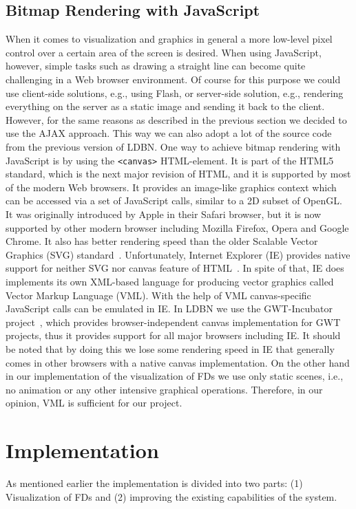 \subsection{Bitmap Rendering with JavaScript}
\label{sec:renderingJS}
When it comes to visualization and graphics in general a more low-level 
pixel control over a certain area of the screen is desired. 
When using JavaScript, however, simple tasks such as drawing a straight
line can become quite challenging in a Web browser environment.
Of course for this purpose we could use client-side solutions, e.g., 
using Flash, or server-side solution, e.g., 
rendering everything on the server as a static image 
and sending it back
to the client. However, for the same reasons as described in the previous
section we decided to use the AJAX approach. This way we can also
adopt a lot of the source code from the previous version of LDBN. 
One way to achieve bitmap rendering with JavaScript is by
using the \verb=<canvas>= HTML-element. 
It is part of the HTML5~\cite{html5} standard, which is the next major revision of HTML, and it is supported by
most of the modern Web browsers. It provides an image-like 
graphics context which can be accessed via a set of JavaScript calls, 
similar to a 2D subset of OpenGL. 
It was originally introduced by Apple in their Safari browser, but it is now 
supported by other modern browser including Mozilla Firefox, Opera and Google Chrome.
It also has better rendering speed than the older Scalable Vector Graphics (SVG) standard~\cite{w8}. 
Unfortunately, Internet Explorer (IE) provides native support for 
neither SVG nor canvas feature of HTML~\cite{w9}. In spite of that, IE does 
implements its own XML-based language for producing vector graphics 
called Vector Markup Language (VML). With the help of VML canvas-specific JavaScript 
calls can be emulated in IE. In LDBN we use the GWT-Incubator project~\cite{gwtincubator}, which provides
browser-independent canvas implementation for GWT projects, thus 
it provides support for all major browsers including IE. 
It should be noted that by doing this
we lose some rendering speed in IE that generally comes in other browsers
with a native canvas implementation. 
On the other hand in our implementation of the visualization of FDs we use only static scenes, i.e., 
no animation or any other intensive 
graphical operations. Therefore, in our opinion, VML is sufficient for our project. 

\section{Implementation}
\label{sec:implementation}
As mentioned earlier the implementation is divided into two parts: 
(1) Visualization of FDs and 
(2) improving the existing capabilities of the system.

